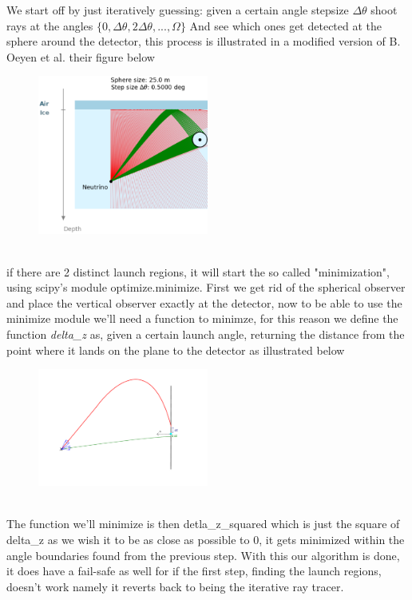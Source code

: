 \documentclass[11pt,a4paper,faculty=we,language=en,doctype=report]{cls/ugent-doc}
\begin{document}
We start off by just iteratively guessing: given a certain angle stepsize
$\Delta \theta$ shoot rays at the angles $\{0,\Delta \theta, 2\Delta
\theta,...,\Omega\}$ And see which ones get detected at the sphere around the
detector, this process is illustrated in a modified version of B. Oeyen et al.
their figure below\\
\begin{figure}[h!]
  \centering
  \includegraphics[width=0.5\textwidth]{begin_explanation.png}
\end{figure}\\
if there are 2 distinct launch regions, it will start the so called "minimization", using scipy's module 
optimize.minimize. First we get rid of the spherical observer and place the vertical observer exactly at
the detector, now
to be able to use the minimize module we'll need a function to minimze, for this reason we define the function 
\textit{delta\_z} as, given a certain launch angle, returning the distance from the point where it lands on the
plane to the detector as illustrated below
\begin{figure}[h!]
  \centering
  \includegraphics[width=0.5\textwidth]{PrincipleHybridIllu.pdf}
\end{figure}\\
The function we'll minimize is then detla\_z\_squared which is just the square of delta\_z as we wish it to be
as close as possible to 0, it gets minimized within the angle boundaries found from the previous step.
With this our algorithm is done, it does have a fail-safe as well for if the first step, finding the launch
regions, doesn't work namely it reverts back to being the iterative ray tracer.
\end{document}
